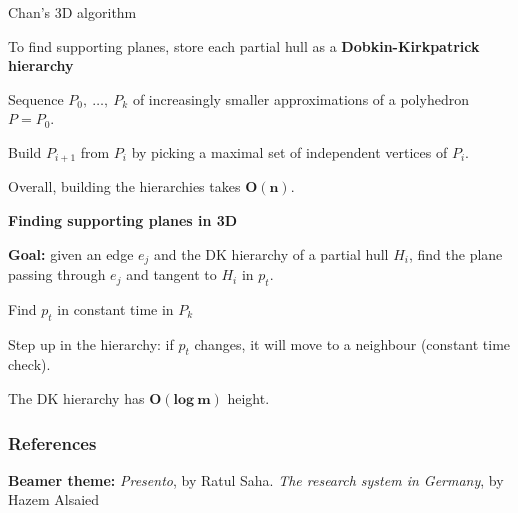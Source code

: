 \documentclass[14pt]{beamer}
\begin{document}
\begin{frame}{Chan's 3D algorithm}
	\begin{center}
		\begin{fullpageitemize}
			\vspace{-4mm}
			\item<1->[\rtarrow] To find supporting planes, store each partial hull as a \textbf{Dobkin-Kirkpatrick hierarchy}
			\fontsize{12}{14}\notosansfont
			\begin{sublist}
				\item<2-> Sequence $P_0,\ \ldots,\ P_k$ of increasingly smaller approximations of a polyhedron $P = P_0$.
				\item<3-> Build $P_{i+1}$ from $P_i$ by picking a \textcolor{colorblue}{maximal set of independent vertices} of $P_i$. 
				\item<4-> Overall, building the hierarchies takes \textcolor{colorgreen}{$\bm{O(n)}$}.
			\end{sublist}
			
			\vspace{4mm}
			\item<5->[\rtarrow] \textbf{Finding supporting planes in 3D}	
			\fontsize{12}{14}\notosansfont
			\begin{sublist}
				\item<6-> \textbf{Goal:} given an edge $e_j$ and the DK hierarchy of a partial hull $H_i$, find the \textcolor{colorblue}{plane} passing through $e_j$ and \textcolor{colorblue}{tangent} to $H_i$ in $p_t$.
				\item<7-> Find $p_t$ in constant time in $P_k$
				\item<8-> Step up in the hierarchy: if $p_t$ changes, it will move to a \textcolor{colorblue}{neighbour} (constant time check).
				\item<9-> The DK hierarchy has \textcolor{colorgreen}{$\bm{O(log\ m)}$} height.
			\end{sublist}
		\end{fullpageitemize}
	\end{center}
\end{frame}



\begin{frame}[allowframebreaks]
	\frametitle{References}
	\nocite{*}
	\scriptsize{}	
	\begin{baseitemize}
		\item \textbf{Beamer theme:} \textit{Presento}, by 
		Ratul Saha. \textit{The research system in Germany}, by Hazem Alsaied
	\end{baseitemize}
\end{frame}
\end{document}
